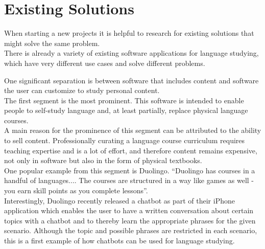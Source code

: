 \section{Existing Solutions}
\label{existing}

When starting a new projects it is helpful to research for existing solutions that might solve the same problem.
\\
There is already a variety of existing software applications for language studying, which have very different use cases and solve different problems.

One significant separation is between software that includes content and software the user can customize to study personal content.
\\

The first segment is the most prominent. This software is intended to enable people to self-study language and, at least partially, replace physical language courses.
\\
A main reason for the prominence of this segment can be attributed to the ability to sell content.
Professionally curating a language course curriculum requires teaching expertise and is a lot of effort, and therefore content remains expensive, not only in software but also in the form of physical textbooks.
\\
One popular example from this segment is Duolingo. ``Duolingo has courses in a handful of languages.... The courses are structured in a way like games as well - you earn skill points as you complete lessons''\cite{lifehacker}.
\\
Interestingly, Duolingo recently released a chatbot\cite{topbots2} as part of their iPhone application which enables the user to have a written conversation about certain topics with a chatbot and to thereby learn the appropriate phrases for the given scenario. Although the topic and possible phrases are restricted in each scenario, this is a first example of how chatbots can be used for language studying.



